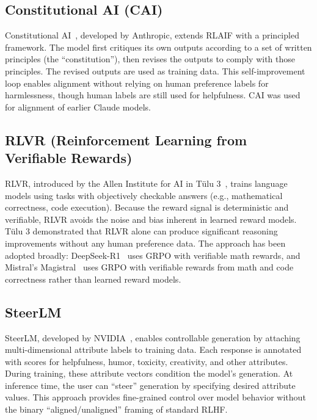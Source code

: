 \documentclass[12pt]{article}
\begin{document}
\subsection{Constitutional AI (CAI)}

Constitutional AI~\cite{Bai2022Constitutional}, developed by Anthropic, extends RLAIF with a principled framework. The model first critiques its own outputs according to a set of written principles (the ``constitution''), then revises the outputs to comply with those principles. The revised outputs are used as training data. This self-improvement loop enables alignment without relying on human preference labels for harmlessness, though human labels are still used for helpfulness. CAI was used for alignment of earlier Claude models.

\subsection{RLVR (Reinforcement Learning from Verifiable Rewards)}

RLVR, introduced by the Allen Institute for AI in T\"ulu 3~\cite{Lambert2024Tulu3}, trains language models using tasks with objectively checkable answers (e.g., mathematical correctness, code execution). Because the reward signal is deterministic and verifiable, RLVR avoids the noise and bias inherent in learned reward models. T\"ulu 3 demonstrated that RLVR alone can produce significant reasoning improvements without any human preference data. The approach has been adopted broadly: DeepSeek-R1~\cite{Guo2025DeepSeekR1} uses GRPO with verifiable math rewards, and Mistral's Magistral~\cite{Mistral2025Magistral} uses GRPO with verifiable rewards from math and code correctness rather than learned reward models.

\subsection{SteerLM}

SteerLM, developed by NVIDIA~\cite{Wang2024SteerLM}, enables controllable generation by attaching multi-dimensional attribute labels to training data. Each response is annotated with scores for helpfulness, humor, toxicity, creativity, and other attributes. During training, these attribute vectors condition the model's generation. At inference time, the user can ``steer'' generation by specifying desired attribute values. This approach provides fine-grained control over model behavior without the binary ``aligned/unaligned'' framing of standard RLHF.
\end{document}
